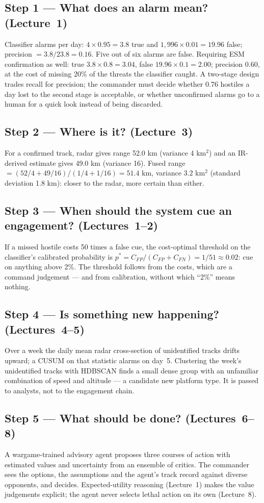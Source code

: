\documentclass[11pt]{article}
\begin{document}
\subsection{Step 1 --- What does an alarm mean? (Lecture~1)}
Classifier alarms per day: $4\times0.95=3.8$ true and $1{,}996\times0.01=19.96$ false; precision $=3.8/23.8=0.16$. Five out of six alarms are false. Requiring ESM confirmation as well: true $3.8\times0.8=3.04$, false $19.96\times0.1=2.00$; precision $0.60$, at the cost of missing 20\% of the threats the classifier caught. A two-stage design trades recall for precision; the commander must decide whether 0.76 hostiles a day lost to the second stage is acceptable, or whether unconfirmed alarms go to a human for a quick look instead of being discarded.
\subsection{Step 2 --- Where is it? (Lecture~3)}
For a confirmed track, radar gives range 52.0 km (variance 4 km$^2$) and an IR-derived estimate gives 49.0 km (variance 16). Fused range $=(52/4+49/16)/(1/4+1/16)=51.4$ km, variance $3.2$ km$^2$ (standard deviation 1.8 km): closer to the radar, more certain than either.
\subsection{Step 3 --- When should the system cue an engagement? (Lectures~1--2)}
If a missed hostile costs 50 times a false cue, the cost-optimal threshold on the classifier's calibrated probability is $p^*=C_{FP}/(C_{FP}+C_{FN})=1/51\approx0.02$: cue on anything above 2\%. The threshold follows from the costs, which are a command judgement --- and from calibration, without which ``2\%'' means nothing.
\subsection{Step 4 --- Is something new happening? (Lectures~4--5)}
Over a week the daily mean radar cross-section of unidentified tracks drifts upward; a CUSUM on that statistic alarms on day~5. Clustering the week's unidentified tracks with HDBSCAN finds a small dense group with an unfamiliar combination of speed and altitude --- a candidate new platform type. It is passed to analysts, not to the engagement chain.
\subsection{Step 5 --- What should be done? (Lectures~6--8)}
A wargame-trained advisory agent proposes three courses of action with estimated values and uncertainty from an ensemble of critics. The commander sees the options, the assumptions and the agent's track record against diverse opponents, and decides. Expected-utility reasoning (Lecture~1) makes the value judgements explicit; the agent never selects lethal action on its own (Lecture~8).
\end{document}
